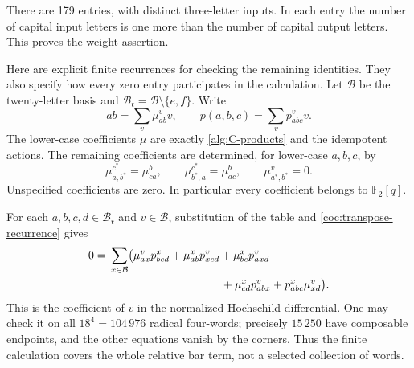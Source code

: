 There are 179 entries, with distinct three-letter inputs.  In each
entry the number of capital input letters is one more than the
number of capital output letters.  This proves the weight assertion.

Here are explicit finite recurrences for checking the remaining
identities.  They also specify how every zero entry participates in
the calculation.  Let $\mathcal B$ be the twenty-letter basis and
$\mathcal B_{\mathfrak r}=\mathcal B\setminus\{e,f\}$.  Write
\[
 ab=\sum_v\mu_{ab}^{v}v,
 \qquad p(a,b,c)=\sum_v p_{abc}^{v}v.
\]
The lower-case coefficients $\mu$ are exactly
\eqref{alg:C-products} and the idempotent actions.  The remaining
coefficients are determined, for lower-case $a,b,c$, by
\begin{equation}
 \mu_{a,b^*}^{c^*}=\mu_{ca}^{b},\qquad
 \mu_{b^*,a}^{c^*}=\mu_{ac}^{b},\qquad
 \mu_{a^*,b^*}^{v}=0.
\label{coc:transpose-recurrence}
\end{equation}
Unspecified coefficients are zero.  In particular every coefficient
belongs to $\mathbb F_2[q]$.

For each $a,b,c,d\in\mathcal B_{\mathfrak r}$ and $v\in\mathcal B$,
substitution of the table and \eqref{coc:transpose-recurrence} gives
\begin{equation}
\begin{split}
0={}&\sum_{x\in\mathcal B}\bigl(
 \mu_{ax}^{v}p_{bcd}^{x}
 +\mu_{ab}^{x}p_{xcd}^{v}
 +\mu_{bc}^{x}p_{axd}^{v}\\
 &\hspace{35mm}
 +\mu_{cd}^{x}p_{abx}^{v}
 +p_{abc}^{x}\mu_{xd}^{v}\bigr).
\end{split}
\label{coc:closure-recurrence}
\end{equation}
This is the coefficient of $v$ in the normalized Hochschild
differential.  One may check it on all $18^4=104\,976$ radical
four-words; precisely $15\,250$ have composable endpoints, and the
other equations vanish by the corners.  Thus the finite calculation
covers the whole relative bar term, not a selected collection of
words.

